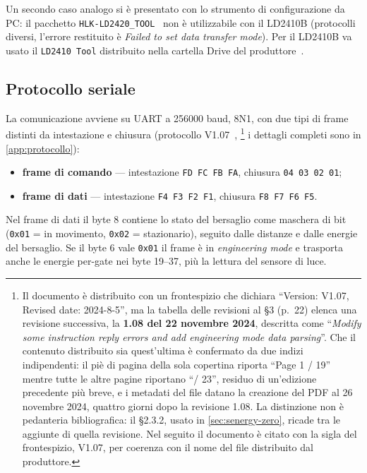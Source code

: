 Un secondo caso analogo si è presentato con lo strumento di configurazione da PC:
il pacchetto \texttt{HLK-LD2420\_TOOL}~\cite{hilinkDriveLD2420} non è utilizzabile
con il LD2410B (protocolli
diversi, l'errore restituito è \emph{Failed to set data transfer mode}). Per il
LD2410B va usato il \texttt{LD2410 Tool} distribuito nella cartella Drive del
produttore~\cite{hilinkDriveLD2410B}.

\subsection{Protocollo seriale}
\label{sec:protocollo-seriale}

La comunicazione avviene su UART a 256000 baud, 8N1, con due tipi di frame
distinti da intestazione e chiusura (protocollo V1.07~\cite{hilinkProtoV107},%
\footnote{Il documento \`e distribuito con un frontespizio che dichiara
``Version: V1.07, Revised date: 2024-8-5'', ma la tabella delle revisioni al
\S3 (p.~22) elenca una revisione successiva, la \textbf{1.08 del 22 novembre
2024}, descritta come ``\emph{Modify some instruction reply errors and add
engineering mode data parsing}''. Che il contenuto distribuito sia
quest'ultima \`e confermato da due indizi indipendenti: il pi\`e di pagina
della sola copertina riporta ``Page 1 / 19'' mentre tutte le altre pagine
riportano ``/ 23'', residuo di un'edizione precedente pi\`u breve, e i
metadati del file datano la creazione del PDF al 26 novembre 2024, quattro
giorni dopo la revisione 1.08. La distinzione non \`e pedanteria
bibliografica: il \S2.3.2, usato in \cref{sec:senergy-zero}, ricade tra le
aggiunte di quella revisione. Nel seguito il documento \`e citato con la sigla
del frontespizio, V1.07, per coerenza con il nome del file distribuito dal
produttore.} i
dettagli completi sono in \cref{app:protocollo}):

\begin{itemize}[leftmargin=1.4em,itemsep=2pt]
  \item \textbf{frame di comando} --- intestazione \texttt{FD FC FB FA}, chiusura
        \texttt{04 03 02 01};
  \item \textbf{frame di dati} --- intestazione \texttt{F4 F3 F2 F1}, chiusura
        \texttt{F8 F7 F6 F5}.
\end{itemize}

Nel frame di dati il byte 8 contiene lo stato del bersaglio come maschera di bit
(\texttt{0x01} = in movimento, \texttt{0x02} = stazionario), seguito dalle distanze
e dalle energie del bersaglio. Se il byte 6 vale \texttt{0x01} il frame è in
\emph{engineering mode} e trasporta anche le energie per-gate nei byte 19--37, più
la lettura del sensore di luce.

